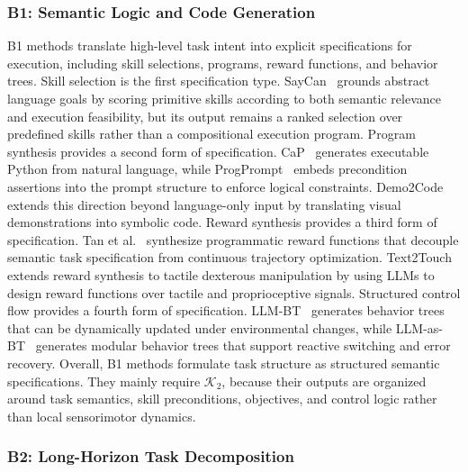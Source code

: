 \documentclass[acmsmall,screen,review]{acmart}
\begin{document}
\subsubsection{B1: Semantic Logic and Code Generation}\label{sec:code_gen}

B1 methods translate high-level task intent into explicit specifications for execution, including skill selections, programs, reward functions, and behavior trees.
Skill selection is the first specification type.
SayCan~\cite{brohan2023can} grounds abstract language goals by scoring primitive skills according to both semantic relevance and execution feasibility, 
but its output remains a ranked selection over predefined skills rather than a compositional execution program.
Program synthesis provides a second form of specification.
CaP~\cite{liang2022code} generates executable Python from natural language, while ProgPrompt~\cite{singh2022progprompt} embeds precondition assertions into the prompt structure to enforce logical constraints.
Demo2Code~\cite{wang2023demo2code} extends this direction beyond language-only input by translating visual demonstrations into symbolic code.
Reward synthesis provides a third form of specification.
Tan et al.~\cite{tan2023l2r} synthesize programmatic reward functions that decouple semantic task specification from continuous trajectory optimization.
Text2Touch~\cite{field2025text2touch} extends reward synthesis to tactile dexterous manipulation by using LLMs to design reward functions over tactile and proprioceptive signals.
Structured control flow provides a fourth form of specification.
LLM-BT~\cite{zhou2024llmbt} generates behavior trees that can be dynamically updated under environmental changes, while LLM-as-BT~\cite{ao2025llmbt} generates modular behavior trees that support reactive switching and error recovery.
Overall, B1 methods formulate task structure as structured semantic specifications.
They mainly require \(\mathcal{K}_2\), because their outputs are organized around task semantics, skill preconditions, objectives, and control logic rather than local sensorimotor dynamics.

\subsubsection{B2: Long-Horizon Task Decomposition}\label{sec:task_decomp}
\end{document}
